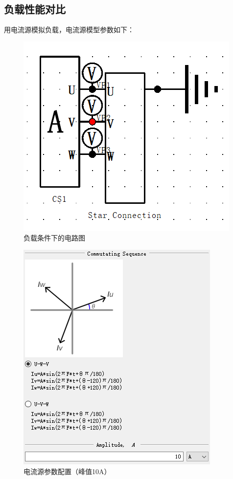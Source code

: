\documentclass{thuemp}
\begin{document}
\subsection{负载性能对比}

用电流源模拟负载，电流源模型参数如下：
\begin{figure}[H]
  \centering
  \includegraphics[width=0.8\linewidth]{./img/task2/load.png}
  \caption{负载条件下的电路图}
\end{figure}
\begin{figure}[H]
  \centering
  \includegraphics[width=0.8\linewidth]{./img/task2/load-config.png}
  \caption{电流源参数配置（峰值10A）}
\end{figure}
\end{document}
